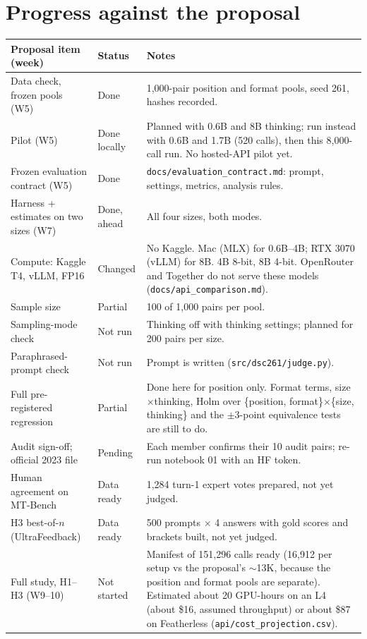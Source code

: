 \documentclass[10.5pt]{article}
\begin{document}
\section{Progress against the proposal}
\begin{table}[H]
\centering\small
\begin{tabularx}{\linewidth}{>{\raggedright\arraybackslash}p{4.6cm} >{\raggedright\arraybackslash}p{2.3cm} X}
\toprule
Proposal item (week) & Status & Notes \\
\midrule
Data check, frozen pools (W5) & Done & 1{,}000-pair position and format pools, seed 261, hashes recorded. \\
Pilot (W5) & Done locally & Planned with 0.6B and 8B thinking; run instead with 0.6B and 1.7B (520 calls), then this 8{,}000-call run. No hosted-API pilot yet. \\
Frozen evaluation contract (W5) & Done & \texttt{docs/evaluation\_contract.md}: prompt, settings, metrics, analysis rules. \\
Harness + estimates on two sizes (W7) & Done, ahead & All four sizes, both modes. \\
Compute: Kaggle T4, vLLM, FP16 & Changed & No Kaggle. Mac (MLX) for 0.6B--4B; RTX 3070 (vLLM) for 8B. 4B 8-bit, 8B 4-bit. OpenRouter and Together do not serve these models (\texttt{docs/api\_comparison.md}). \\
Sample size & Partial & 100 of 1{,}000 pairs per pool. \\
Sampling-mode check & Not run & Thinking off with thinking settings; planned for 200 pairs per size. \\
Paraphrased-prompt check & Not run & Prompt is written (\texttt{src/dsc261/judge.py}). \\
Full pre-registered regression & Partial & Done here for position only. Format terms, size$\times$thinking, Holm over \{position, format\}$\times$\{size, thinking\} and the $\pm$3-point equivalence tests are still to do. \\
Audit sign-off; official 2023 file & Pending & Each member confirms their 10 audit pairs; re-run notebook 01 with an HF token. \\
Human agreement on MT-Bench & Data ready & 1{,}284 turn-1 expert votes prepared, not yet judged. \\
H3 best-of-$n$ (UltraFeedback) & Data ready & 500 prompts $\times$ 4 answers with gold scores and brackets built, not yet judged. \\
Full study, H1--H3 (W9--10) & Not started & Manifest of 151{,}296 calls ready (16{,}912 per setup vs the proposal's $\sim$13K, because the position and format pools are separate). Estimated about 20 GPU-hours on an L4 (about \$16, assumed throughput) or about \$87 on Featherless (\texttt{api/cost\_projection.csv}). \\
\bottomrule
\end{tabularx}
\end{table}
\end{document}
